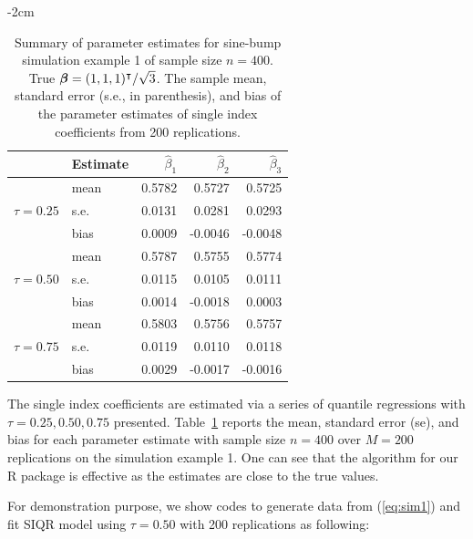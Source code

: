 \begin{table}[!ht]
	\caption{Summary of parameter estimates for sine-bump simulation example 1 of sample size $n=400$. True  $\mbox{\boldmath$\beta$} = (1,1,1)^{\intercal} / \sqrt{3}$. The sample mean, standard error (s.e., in parenthesis), and bias of the parameter estimates of single index coefficients from 200 replications.}
	\centering
	\addtolength{\leftskip} {-2cm}
	\addtolength{\rightskip}{-2cm}
	
	\begin{tabular}{llrrr}
		\hline
		& Estimate & $\hat{\beta}_1$ & $\hat{\beta}_2$ & $\hat{\beta}_3$ \\ \hline
		& mean     & 0.5782          & 0.5727          & 0.5725          \\
		$\tau = 0.25$ & s.e.     & 0.0131          & 0.0281          & 0.0293          \\
		& bias     & 0.0009          & -0.0046         & -0.0048         \\
		& mean     & 0.5787          & 0.5755          & 0.5774          \\
		$\tau = 0.50$ & s.e.     & 0.0115          & 0.0105          & 0.0111          \\
		& bias     & 0.0014          & -0.0018         & 0.0003          \\
		& mean     & 0.5803          & 0.5756          & 0.5757          \\
		$\tau = 0.75$ & s.e.     & 0.0119          & 0.0110          & 0.0118          \\
		& bias     & 0.0029          & -0.0017         & -0.0016         \\ \hline
	\end{tabular}
	
	\label{tb:sim1}	
\end{table}

The single index coefficients are estimated via a series of quantile regressions with $\tau = 0.25, 0.50, 0.75$ presented. Table~\ref{tb:sim1} reports the mean, standard error (se), and bias for each parameter estimate with sample size $n=400$ over $M=200$ replications on the simulation example 1.  One can see that the algorithm for our R package  is effective as the estimates are close to the true values. 

For demonstration purpose, we show codes to generate data from (\ref{eq:sim1}) and fit SIQR model using $\tau = 0.50$ with 200 replications as following:

\begin{Schunk}
\end{Schunk}

